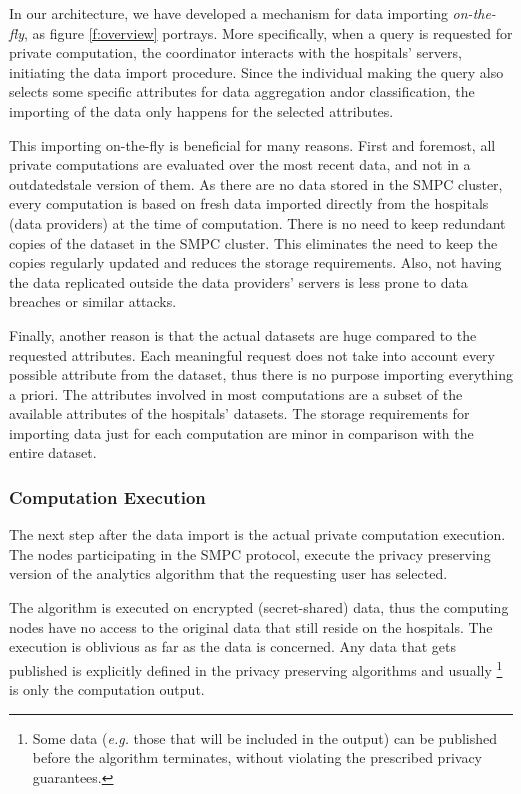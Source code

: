 In our architecture, we have developed a mechanism for data importing \textit{on-the-fly}, as figure \ref{f:overview} portrays.
More specifically, when a query is requested for private computation, the coordinator interacts with the hospitals' servers, initiating the data import procedure.
Since the individual making the query also selects some specific attributes for data aggregation and\myslash or classification, the importing of the data only happens for the selected attributes.

This importing on-the-fly is beneficial for many reasons.
First and foremost, all private computations are evaluated over the most recent data, and not in a outdated\myslash stale version of them.
As there are no data stored in the SMPC cluster, every computation is based on fresh data imported directly from the hospitals (data providers) at the time of computation.
There is no need to keep redundant copies of the dataset in the SMPC cluster.
This eliminates the need to keep the copies regularly updated and reduces the storage requirements.
Also, not having the data replicated outside the data providers' servers is less prone to data breaches or similar attacks.

Finally, another reason is that the actual datasets are huge compared to the requested attributes.
Each meaningful request does not take into account every possible attribute from the dataset, thus there is no purpose importing everything a priori.
The attributes involved in most computations are a subset of the available attributes of the hospitals' datasets.
The storage requirements for importing data just for each computation are minor in comparison with the entire dataset.


\subsubsection{Computation Execution}\label{sss:computation-execution}
The next step after the data import is the actual private computation execution.
The nodes participating in the SMPC protocol, execute the privacy preserving version of the analytics algorithm that the requesting user has selected.

The algorithm is executed on encrypted (secret\hyp shared) data, thus the computing nodes have no access to the original data that still reside on the hospitals.
The execution is oblivious as far as the data is concerned.
Any data that gets published is explicitly defined in the privacy preserving algorithms and usually \footnote{Some data (\textit{e.g.} those that will be included in the output) can be published before the algorithm terminates, without violating the prescribed privacy guarantees.} is only the computation output.

